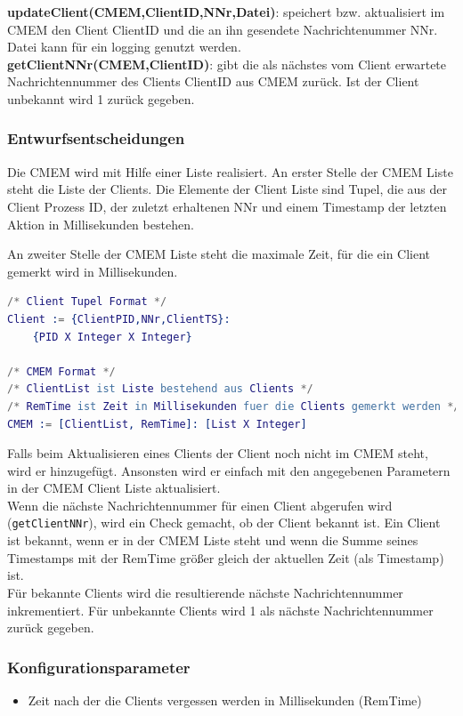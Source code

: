 \documentclass{article}
\begin{document}
\textbf{updateClient(CMEM,ClientID,NNr,Datei)}: speichert bzw. aktualisiert im CMEM den Client ClientID und die an ihn gesendete Nachrichtenummer NNr. Datei kann für ein logging genutzt werden.\\

\textbf{getClientNNr(CMEM,ClientID)}: gibt die als nächstes vom Client erwartete Nachrichtennummer des Clients ClientID aus CMEM zurück. Ist der Client unbekannt wird 1 zurück gegeben.\\

\subsubsection{Entwurfsentscheidungen}
Die CMEM wird mit Hilfe einer Liste realisiert. An erster Stelle der CMEM Liste steht die Liste der Clients. Die Elemente der Client Liste sind Tupel, die aus der Client Prozess ID, der zuletzt erhaltenen NNr und einem Timestamp der letzten Aktion in Millisekunden bestehen.

An zweiter Stelle der CMEM Liste steht die maximale Zeit, für die ein Client gemerkt wird in Millisekunden.

\begin{lstlisting}[language=erlang]
/* Client Tupel Format */
Client := {ClientPID,NNr,ClientTS}:
    {PID X Integer X Integer}

/* CMEM Format */
/* ClientList ist Liste bestehend aus Clients */
/* RemTime ist Zeit in Millisekunden fuer die Clients gemerkt werden */
CMEM := [ClientList, RemTime]: [List X Integer]
\end{lstlisting}

Falls beim Aktualisieren eines Clients der Client noch nicht im CMEM steht, wird er hinzugefügt.
Ansonsten wird er einfach mit den angegebenen Parametern in der CMEM Client Liste aktualisiert.\\

Wenn die nächste Nachrichtennummer für einen Client abgerufen wird (\texttt{getClientNNr}), wird ein Check gemacht, ob der Client bekannt ist.
Ein Client ist bekannt, wenn er in der CMEM Liste steht und wenn die Summe seines Timestamps mit der RemTime größer gleich der aktuellen Zeit (als Timestamp) ist.\\

Für bekannte Clients wird die resultierende nächste Nachrichtennummer inkrementiert. Für unbekannte Clients wird 1 als nächste Nachrichtennummer zurück gegeben.

\subsubsection{Konfigurationsparameter}
\begin{itemize}
    \item Zeit nach der die Clients vergessen werden in Millisekunden (RemTime)
\end{itemize}
\end{document}
